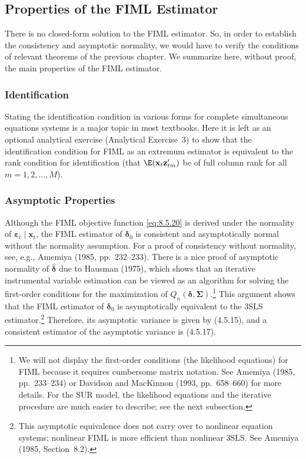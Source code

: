 \subsection*{Properties of the FIML Estimator}

There is no closed-form solution to the FIML estimator. So, in order to establish
the consistency and asymptotic normality, we would have to verify the conditions
of relevant theorems of the previous chapter. We summarize here, without proof,
the main properties of the FIML estimator.

\subsubsection*{Identification}

Stating the identification condition in various forms for complete simultaneous
equations systems is a major topic in most textbooks. Here it is left as an optional
analytical exercise (Analytical Exercise~3) to show that the identification condition for FIML as an extremum estimator is equivalent to the rank condition for
identification (that $\E(\mathbf{x}_t\mathbf{z}_{tm}')$ be of full column rank for all
$m = 1, 2, \ldots, M$).

\subsubsection*{Asymptotic Properties}

Although the FIML objective function \eqref{eq:8.5.20} is derived under the normality of
$\boldsymbol{\varepsilon}_t \mid \mathbf{x}_t$, the FIML estimator of $\boldsymbol{\delta}_0$ is consistent and asymptotically normal without
the normality assumption. For a proof of consistency without normality, see, e.g.,
Amemiya (1985, pp.~232--233). There is a nice proof of asymptotic normality
of $\hat{\boldsymbol{\delta}}$ due to Hausman (1975), which shows that an iterative instrumental variable
estimation can be viewed as an algorithm for solving the first-order conditions for
the maximization of $Q_n(\boldsymbol{\delta}, \boldsymbol{\Sigma})$.\footnote{We will not display the first-order conditions (the likelihood equations) for FIML because it requires
cumbersome matrix notation. See Amemiya (1985, pp.~233--234) or Davidson and MacKinnon (1993, pp.~658--660) for more details. For the SUR model, the likelihood equations and the iterative procedure are much easier
to describe; see the next subsection.}
This argument shows that the FIML estimator of
$\boldsymbol{\delta}_0$ is asymptotically equivalent to the 3SLS estimator.\footnote{This asymptotic equivalence does not carry over to nonlinear equation systems; nonlinear FIML is more
efficient than nonlinear 3SLS. See Amemiya (1985, Section~8.2).}
Therefore, its asymptotic
variance is given by (4.5.15), and a consistent estimator of the asymptotic variance
is (4.5.17).


